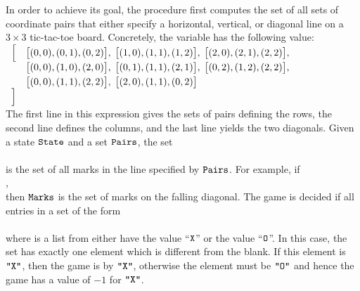 \begin{enumerate}
      In order to achieve its goal, the procedure first computes the set of all sets of coordinate pairs that 
      either specify a horizontal, vertical, or diagonal line on a $3 \times 3$ tic-tac-toe board.  Concretely,
      the variable  has the following value:
      \\[0.2cm]
      \hspace*{1.3cm}
      $
      \begin{array}{ll}
       \Bigl[ & \bigl[(0, 0), (0, 1), (0, 2)\bigr], \;
                \bigl[(1, 0), (1, 1), (1, 2)\bigr], \;
                \bigl[(2, 0), (2, 1), (2, 2)\bigr],   \\[0.1cm]
              & \bigl[(0, 0), (1, 0), (2, 0)\bigr], \;
                \bigl[(0, 1), (1, 1), (2, 1)\bigr], \;
                \bigl[(0, 2), (1, 2), (2, 2)\bigr],   \\[0.1cm]
              & \bigl[(0, 0), (1, 1), (2, 2)\bigr], \;
                \bigl[(2, 0), (1, 1), (0, 2)\bigr]    \\
       \Bigr]
      \end{array}
      $
      \\[0.2cm]
      The first line in this expression gives the sets of pairs defining the rows, the second line defines 
      the columns, and the last line yields the two diagonals.  Given a state $\texttt{State}$ and a set
      $\texttt{Pairs}$, the set 
      \\[0.2cm]
      \hspace*{1.3cm}
      \\[0.2cm]
      is the set of all marks in the line specified by $\texttt{Pairs}$.  For example, if 
      \\[0.2cm]
      \hspace*{1.3cm}
      ,
      \\[0.2cm]
      then $\texttt{Marks}$ is the set of marks on the falling diagonal.
      The game is decided if all entries in a set of the form 
      \\[0.2cm]
      \hspace*{1.3cm}
      \\[0.2cm]
      where  is a list from  either have the value
      ``$\texttt{X}$'' or the value ``$\texttt{O}$''.  In this case, the set  has exactly one
      element which is different from the blank.  If this element is $\texttt{"X"}$, then the
      game is  by $\texttt{"X"}$, otherwise the element must be $\texttt{"O"}$ and hence
      the game has a value of $-1$ for $\texttt{"X"}$.


\end{enumerate}
